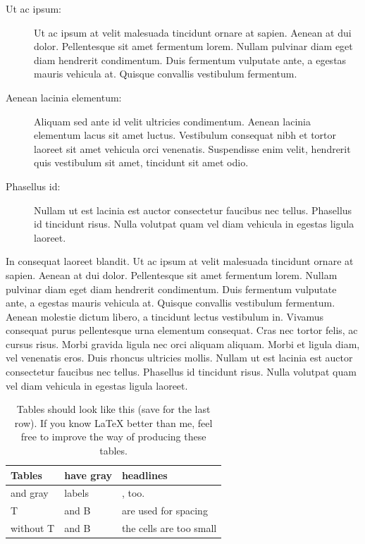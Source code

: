 \begin{description}
\item[Ut ac ipsum:]
Ut ac ipsum at velit malesuada tincidunt ornare at sapien. Aenean at dui dolor. Pellentesque sit amet fermentum lorem. Nullam pulvinar diam eget diam hendrerit condimentum. Duis fermentum vulputate ante, a egestas mauris vehicula at. Quisque convallis vestibulum fermentum.

\item[Aenean lacinia elementum:]
Aliquam sed ante id velit ultricies condimentum. Aenean lacinia elementum lacus sit amet luctus. Vestibulum consequat nibh et tortor laoreet sit amet vehicula orci venenatis. Suspendisse enim velit, hendrerit quis vestibulum sit amet, tincidunt sit amet odio.

\item[Phasellus id:]
Nullam ut est lacinia est auctor consectetur faucibus nec tellus. Phasellus id tincidunt risus. Nulla volutpat quam vel diam vehicula in egestas ligula laoreet. 

\end{description}

In consequat laoreet blandit. Ut ac ipsum at velit malesuada tincidunt ornare at sapien. Aenean at dui dolor. Pellentesque sit amet fermentum lorem. Nullam pulvinar diam eget diam hendrerit condimentum. Duis fermentum vulputate ante, a egestas mauris vehicula at. Quisque convallis vestibulum fermentum. Aenean molestie dictum libero, a tincidunt lectus vestibulum in. Vivamus consequat purus pellentesque urna elementum consequat. Cras nec tortor felis, ac cursus risus. Morbi gravida ligula nec orci aliquam aliquam. Morbi et ligula diam, vel venenatis eros. Duis rhoncus ultricies mollis. Nullam ut est lacinia est auctor consectetur faucibus nec tellus. Phasellus id tincidunt risus. Nulla volutpat quam vel diam vehicula in egestas ligula laoreet. 

\begin{table}[b]
\caption{Tables should look like this (save for the last row). If you know LaTeX better than me, feel free to improve the way of producing these tables.}
\begin{tabularx}{\linewidth}{|l|X|X|}
\hline
\rowcolor{slightgray}
\T Tables	&have gray  &headlines\\
\hline
\cellcolor{slightgray}\T and gray &labels \B&, too.\\
\hline
\cellcolor{slightgray}\T T &and B& are used for spacing\B\\
\hline
\cellcolor{slightgray} without T & and B& the cells are too small\B\\
\hline 
\end{tabularx}
\label{tab:example}
\end{table}

